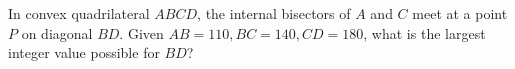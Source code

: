 In convex quadrilateral $ABCD$, the internal bisectors of $A$ and $C$ meet at a point $P$ on diagonal $BD$. Given $AB=110,BC=140,CD=180$, what is the largest integer value possible for $BD$?
